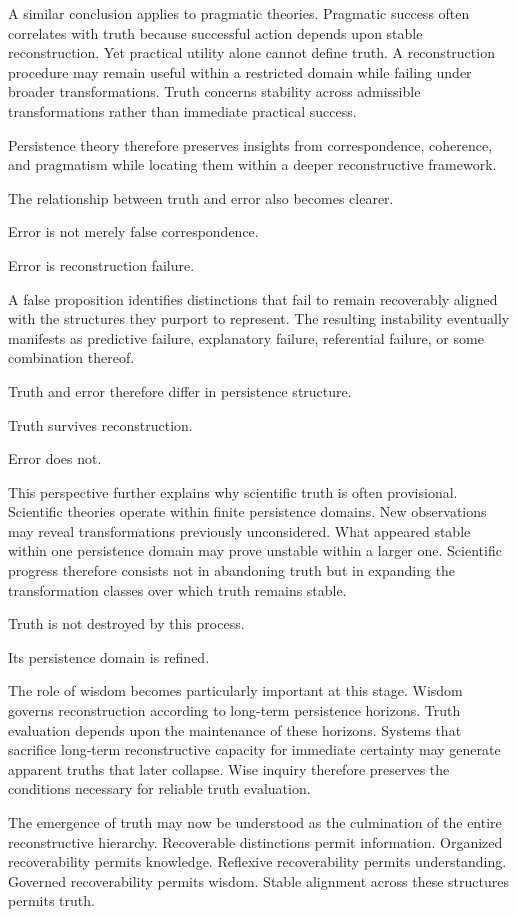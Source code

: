 \documentclass[12pt,oneside]{article}
\theoremstyle{definition}
\begin{document}
A similar conclusion applies to pragmatic theories. Pragmatic success often correlates with truth because successful action depends upon stable reconstruction. Yet practical utility alone cannot define truth. A reconstruction procedure may remain useful within a restricted domain while failing under broader transformations. Truth concerns stability across admissible transformations rather than immediate practical success.

Persistence theory therefore preserves insights from correspondence, coherence, and pragmatism while locating them within a deeper reconstructive framework.

The relationship between truth and error also becomes clearer.

Error is not merely false correspondence.

Error is reconstruction failure.

A false proposition identifies distinctions that fail to remain recoverably aligned with the structures they purport to represent. The resulting instability eventually manifests as predictive failure, explanatory failure, referential failure, or some combination thereof.

Truth and error therefore differ in persistence structure.

Truth survives reconstruction.

Error does not.

This perspective further explains why scientific truth is often provisional. Scientific theories operate within finite persistence domains. New observations may reveal transformations previously unconsidered. What appeared stable within one persistence domain may prove unstable within a larger one. Scientific progress therefore consists not in abandoning truth but in expanding the transformation classes over which truth remains stable.

Truth is not destroyed by this process.

Its persistence domain is refined.

The role of wisdom becomes particularly important at this stage. Wisdom governs reconstruction according to long-term persistence horizons. Truth evaluation depends upon the maintenance of these horizons. Systems that sacrifice long-term reconstructive capacity for immediate certainty may generate apparent truths that later collapse. Wise inquiry therefore preserves the conditions necessary for reliable truth evaluation.

The emergence of truth may now be understood as the culmination of the entire reconstructive hierarchy. Recoverable distinctions permit information. Organized recoverability permits knowledge. Reflexive recoverability permits understanding. Governed recoverability permits wisdom. Stable alignment across these structures permits truth.
\end{document}
